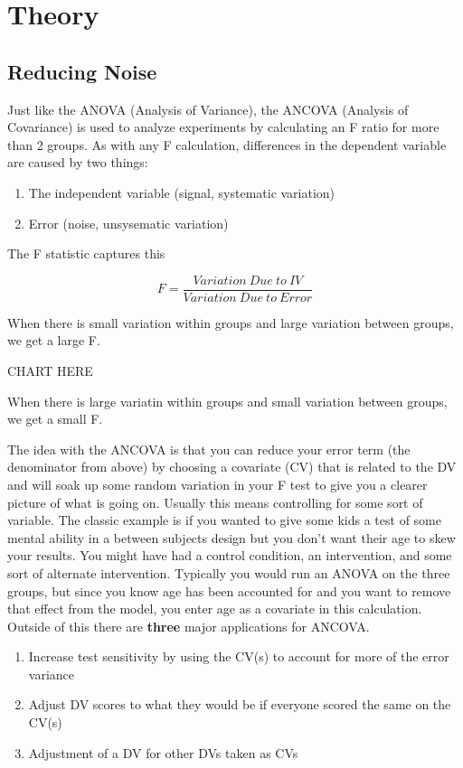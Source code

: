 \documentclass[]{book}
\providecommand{\tightlist}{%
  \setlength{\itemsep}{0pt}\setlength{\parskip}{0pt}}
\theoremstyle{definition}
\theoremstyle{definition}
\theoremstyle{definition}
\theoremstyle{remark}
\begin{document}
{\section{Theory}\label{theory-1}

\subsection{Reducing Noise}\label{reducing-noise}

Just like the ANOVA (Analysis of Variance), the ANCOVA (Analysis of
Covariance) is used to analyze experiments by calculating an F ratio for
more than 2 groups. As with any F calculation, differences in the
dependent variable are caused by two things:

\begin{enumerate}
\def\labelenumi{\arabic{enumi}.}
\tightlist
\item
  The independent variable (signal, systematic variation)
\item
  Error (noise, unsysematic variation)
\end{enumerate}

The F statistic captures this

\[ F = \frac{Variation\ Due\ to\ IV}{Variation\ Due\ to\ Error} \]

When there is small variation within groups and large variation between
groups, we get a large F.

CHART HERE

When there is large variatin within groups and small variation between
groups, we get a small F.

The idea with the ANCOVA is that you can reduce your error term (the
denominator from above) by choosing a covariate (CV) that is related to
the DV and will soak up some random variation in your F test to give you
a clearer picture of what is going on. Usually this means controlling
for some sort of variable. The classic example is if you wanted to give
some kids a test of some mental ability in a between subjects design but
you don't want their age to skew your results. You might have had a
control condition, an intervention, and some sort of alternate
intervention. Typically you would run an ANOVA on the three groups, but
since you know age has been accounted for and you want to remove that
effect from the model, you enter age as a covariate in this calculation.
Outside of this there are \textbf{three} major applications for ANCOVA.

\begin{enumerate}
\def\labelenumi{\arabic{enumi}.}
\tightlist
\item
  Increase test sensitivity by using the CV(s) to account for more of
  the error variance
\item
  Adjust DV scores to what they would be if everyone scored the same on
  the CV(s)
\item
  Adjustment of a DV for other DVs taken as CVs
\end{enumerate}

}
\end{document}
